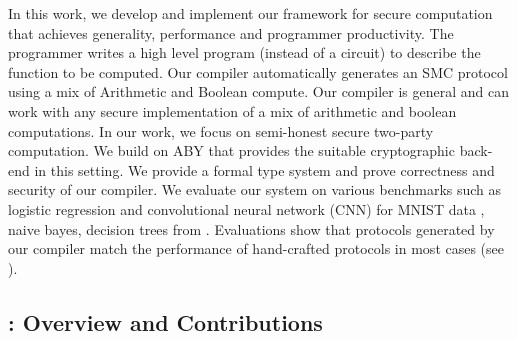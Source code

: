 In this work, we develop and implement our framework \tool {}  for secure computation that achieves generality, performance and programmer productivity. The programmer writes a high level  program (instead of a circuit) to describe the function to be computed. Our compiler automatically generates an SMC protocol using a mix of Arithmetic and Boolean compute. Our compiler is general and can work with any secure implementation of a mix of arithmetic and boolean computations. In our work, we focus on semi-honest secure two-party computation. We build on ABY \cite{aby} that provides the suitable cryptographic back-end in this setting. We provide a formal type system and prove correctness and security of our compiler. We evaluate our system on various benchmarks such as logistic regression and convolutional neural network (CNN) for MNIST data \cite{minionn}, naive bayes, decision trees from \cite{shafindss}. Evaluations show that protocols generated by our compiler match the performance of hand-crafted protocols in most cases (see ). 


\subsection{\tool: Overview and Contributions} 
\label{sec:contrib}

